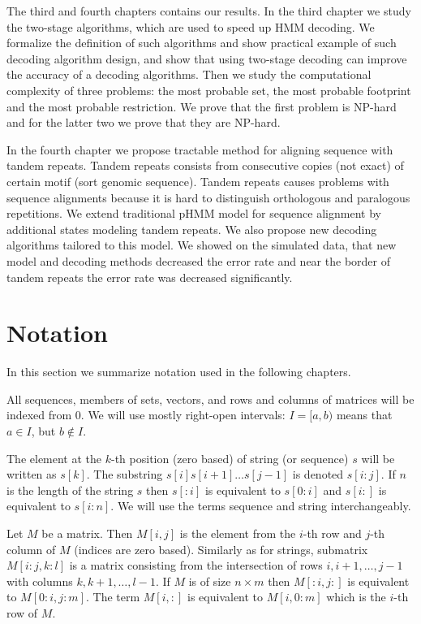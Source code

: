 The third and fourth chapters contains our results. In the third chapter we
study the two-stage algorithms, which are used to speed up HMM decoding. We
formalize the definition of such algorithms and show practical example of such
decoding algorithm design, and show that using two-stage decoding can improve
the accuracy of a decoding algorithms. Then we study the computational
complexity of three problems: the most probable set, the most probable
footprint and the most probable restriction. We prove that the first problem is
NP-hard and for the latter two we prove that they are NP-hard.

In the fourth chapter we propose tractable method for aligning sequence with
tandem repeats. Tandem repeats consists from consecutive copies (not exact) of
certain motif (sort genomic sequence). Tandem repeats causes problems with
sequence alignments because it is hard to distinguish orthologous and
paralogous repetitions. We extend traditional pHMM model for sequence alignment
by additional states modeling tandem repeats. We also propose new decoding
algorithms tailored to this model. We showed on the simulated data, that new
model and decoding methods decreased the error rate and near the border of
tandem repeats the error rate was decreased significantly.

\section{Notation}

In this section we summarize notation used in the following
chapters.

All sequences, members of sets, vectors, and rows and columns of matrices will
be indexed from $0$. We will use mostly right-open intervals: $I=[a,b)$ means
that $a\in I$, but $b\notin I$. 

The element at the $k$-th position (zero based) of string (or sequence) $s$ will
be written as $s[k]$. The substring $s[i]s[i+1]\dots s[j-1]$ is denoted
$s[i:j]$.  If $n$ is the length of the string $s$ then $s[:i]$ is equivalent to
$s[0:i]$ and $s[i:]$ is equivalent to $s[i:n]$.  We will use the terms sequence
and string interchangeably.

Let $M$ be a matrix. Then $M[i,j]$ is the element from the $i$-th row and $j$-th
column of $M$ (indices are zero based). Similarly as for strings, submatrix
$M[i:j,k:l]$ is a matrix consisting from the intersection of rows $i,i+1,\dots,
j-1$ with columns $k,k+1,\dots,l-1$. If $M$ is of size $n\times m$ then
$M[:i,j:]$ is equivalent to $M[0:i,j:m]$.  The term $M[i,:]$ is equivalent to
$M[i,0:m]$ which is the $i$-th row of $M$.
